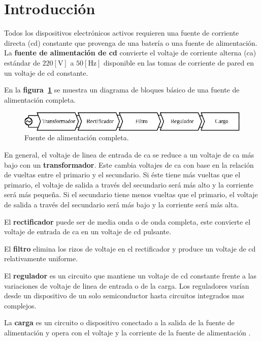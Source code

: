 \section{Introducción}
Todos los dispositivos electrónicos activos requieren una fuente de corriente
directa (cd) constante que provenga de una batería o una fuente de
alimentación. La \textbf{fuente de alimentación de cd} convierte el voltaje de
corriente alterna (ca) estándar de $220[\text{V}]$ a $50[\text{Hz}]$ disponible
en las tomas de corriente de pared en un voltaje de cd constante.

En la \textbf{figura~\ref{diagrama}} se muestra un diagrama de bloques básico de
una fuente de alimentación completa.

\begin{figure}[!h]
\centering
\includegraphics[scale=1.50]{diagramas/00.diagrama.eps}
\caption{Fuente de alimentación completa.}
\label{diagrama}
\end{figure}

En general, el voltaje de linea de entrada de ca se reduce a un voltaje de ca
más bajo con un \textbf{transformador}. Este cambia voltajes de ca con base en
la relación de vueltas entre el primario y el secundario. Si éste tiene más
vueltas que el primario, el voltaje de salida a través del secundario será más
alto y la corriente será más pequeña. Si el secundario tiene menos vueltas que
el primario, el voltaje de salida a través del secundario será más bajo y la
corriente será más alta.

El \textbf{rectificador} puede ser de media onda o de onda completa, este
convierte el voltaje de entrada de ca en un voltaje de cd pulsante.

El \textbf{filtro} elimina los rizos de voltaje en el rectificador y produce un
voltaje de cd relativamente uniforme.

El \textbf{regulador} es un circuito que mantiene un voltaje de cd constante
frente a las variaciones de voltaje de linea de entrada o de la carga. Los
reguladores varían desde un dispositivo de un solo semiconductor hasta circuitos
integrados mas complejos.

La \textbf{carga} es un circuito o dispositivo conectado a la salida de la
fuente de alimentación y opera con el voltaje y la corriente de la fuente de
alimentación \cite{Floyd}.


